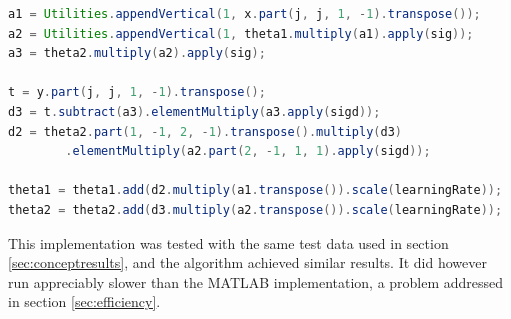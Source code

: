 \begin{lstlisting}[language=Java,label=lst:javanet,caption={Java neural network code},captionpos=b]
a1 = Utilities.appendVertical(1, x.part(j, j, 1, -1).transpose());
a2 = Utilities.appendVertical(1, theta1.multiply(a1).apply(sig));
a3 = theta2.multiply(a2).apply(sig);

t = y.part(j, j, 1, -1).transpose();
d3 = t.subtract(a3).elementMultiply(a3.apply(sigd));
d2 = theta2.part(1, -1, 2, -1).transpose().multiply(d3)
        .elementMultiply(a2.part(2, -1, 1, 1).apply(sigd));

theta1 = theta1.add(d2.multiply(a1.transpose()).scale(learningRate));
theta2 = theta2.add(d3.multiply(a2.transpose()).scale(learningRate));
\end{lstlisting}

This implementation was tested with the same test data used in section \ref{sec:conceptresults}, and the algorithm achieved similar results.  It did however run appreciably slower than the MATLAB implementation, a problem addressed in section \ref{sec:efficiency}.


